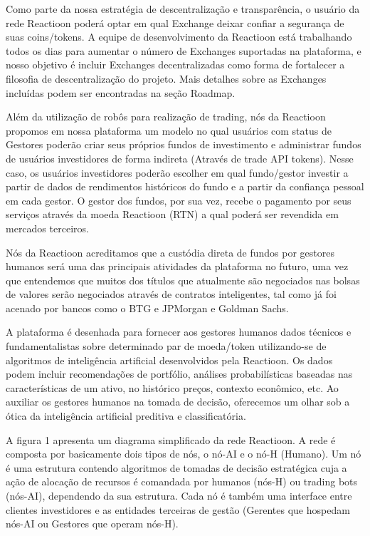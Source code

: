 \documentclass[
	article,			%
	12pt,				%
	oneside,			%
	a4paper,			%
	brazil,				%
	english,
	sumario=tradicional
	]{abntex2}
\begin{document}
Como parte da nossa estratégia de descentralização e transparência, o usuário da rede Reactioon poderá optar em qual Exchange deixar confiar a segurança de suas coins/tokens. A equipe de desenvolvimento da Reactioon está trabalhando todos os dias para aumentar o número de Exchanges suportadas na plataforma, e nosso objetivo é incluir Exchanges decentralizadas como forma de fortalecer a filosofia de descentralização do projeto. Mais detalhes sobre as Exchanges incluídas podem ser encontradas na seção Roadmap.

Além da utilização de robôs para realização de trading, nós da Reactioon propomos em nossa plataforma um modelo no qual usuários com status de Gestores poderão criar seus próprios fundos de investimento e administrar fundos de usuários investidores de forma indireta (Através de trade API tokens). Nesse caso, os usuários investidores poderão escolher em qual fundo/gestor investir a partir de dados de rendimentos históricos do fundo e a partir da confiança pessoal em cada gestor. O gestor dos fundos, por sua vez, recebe o pagamento por seus serviços através da moeda Reactioon (RTN) a qual poderá ser revendida em mercados terceiros. 

Nós da Reactioon acreditamos que a custódia direta de fundos por gestores humanos será uma das principais atividades da plataforma no futuro, uma vez que entendemos que muitos dos títulos que atualmente são negociados nas bolsas de valores serão negociados através de contratos inteligentes, tal como já foi acenado por bancos como o BTG e JPMorgan e Goldman Sachs.

A plataforma é desenhada para fornecer aos gestores humanos dados técnicos e fundamentalistas sobre determinado par de moeda/token utilizando-se de algoritmos de inteligência artificial desenvolvidos pela Reactioon. Os dados podem incluir recomendações de portfólio, análises probabilísticas baseadas nas características de um ativo, no histórico preços, contexto econômico, etc. Ao auxiliar os gestores humanos na tomada de decisão, oferecemos um olhar sob a ótica da inteligência artificial preditiva e classificatória.

A figura 1 apresenta um diagrama simplificado da rede Reactioon. A rede é composta por basicamente dois tipos de nós, o nó-AI e o nó-H (Humano). Um nó é uma estrutura contendo algoritmos de tomadas de decisão estratégica cuja a ação de alocação de recursos é comandada por humanos (nós-H) ou trading bots (nós-AI), dependendo da sua estrutura. Cada nó é também uma interface entre clientes investidores e as entidades terceiras de gestão (Gerentes que hospedam nós-AI ou Gestores que operam nós-H). 
\end{document}
